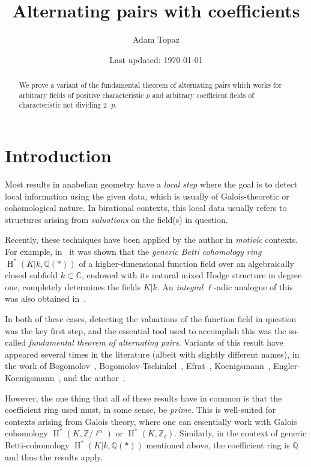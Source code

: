 \documentclass[12pt]{amsart}
\title{Alternating pairs with coefficients}
\author{Adam Topaz}
\date{Last updated: \today}
\newcommand{\HH}{\operatorname{H}}
\newcommand{\Qbb}{\mathbb{Q}}
\newcommand{\Cbb}{\mathbb{C}}
\newcommand{\Zbb}{\mathbb{Z}}
\begin{document}
\maketitle

\begin{abstract}
  We prove a variant of the fundamental theorem of alternating pairs which works for arbitrary fields of positive characteristic $p$ and arbitrary coefficient fields of characteristic not dividing $2 \cdot p$.
\end{abstract}

\tableofcontents

\section{Introduction}

Most results in anabelian geometry have a \emph{local step} where the goal is to detect local information using the given data, which is usually of Galois-theoretic or cohomological nature.
In birational contexts, this local data usually refers to structures arising from \emph{valuations} on the field(s) in question.

Recently, these techniques have been applied by the author in \emph{motivic} contexts.
For example, in~\cite{https://doi.org/10.48550/arxiv.1705.01084} it was shown that the \emph{generic Betti cohomology ring} $\HH^{*}(K|k,\Qbb(*))$ of a higher-dimensional function field over an algebraically closed subfield $k \subset \Cbb$, endowed with its natural mixed Hodge structure in degree one, completely determines the fields $K|k$.
An \emph{integral} $\ell$-adic analogue of this was also obtained in~\cite{https://doi.org/10.48550/arxiv.1910.03563}.

In both of these cases, detecting the valuations of the function field in question was the key first step, and the essential tool used to accomplish this was the so-called \emph{fundamental theorem of alternating pairs}.
Variants of this result have appeared several times in the literature (albeit with slightly different names), in the work of Bogomolov~\cite{zbMATH00124400}, Bogomolov-Tschinkel~\cite{zbMATH02078165}, Efrat~\cite{zbMATH01489500}, Koenigsmann~\cite{zbMATH00785379}, Engler-Koenigsmann~\cite{zbMATH01135369}, and the author~\cite{zbMATH06778776,https://doi.org/10.48550/arxiv.1705.01084}.

However, the one thing that all of these results have in common is that the coefficient ring used must, in some sense, be \emph{prime}.
This is well-suited for contexts arising from Galois theory, where one can essentially work with Galois cohomology $\HH^{*}(K,\Zbb/\ell^{n})$ or $\HH^{*}(K,\Zbb_{\ell})$.
Similarly, in the context of generic Betti-cohomology $\HH^{*}(K|k,\Qbb(*))$ mentioned above, the coefficient ring is $\Qbb$ and thus the results apply.
\end{document}
